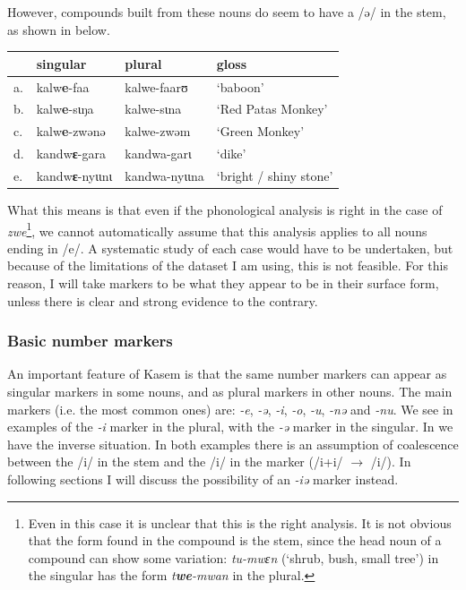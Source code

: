 However, compounds built from these nouns do seem to have a /ə/ in the stem, as shown in  below.

\begin{exe}
    \ex \label{stem-E-compounds}
    \begin{tabular}[t]{llll}
      & singular      & plural        & gloss                                          \\
      \midrule
      a. & kalw\textbf{e}-faa     & kalwe-faarʊ   & `baboon'                                       \\
      b. & kalw\textbf{e}-sɩŋa    & kalwe-sɩna    & `Red Patas Monkey'                             \\
      c. & kalw\textbf{e}-zwənə   & kalwe-zwəm    & `Green Monkey'                                 \\
      d. & kandw\textbf{ɛ}-gara   & kandwa-garɩ   & `dike' \\
      e. & kandw\textbf{ɛ}-nyɩɩnɩ & kandwa-nyɩɩna & `bright / shiny stone'                         \\
    \end{tabular}
\end{exe}

What this means is that even if the phonological analysis is right in the case of \textit{zwe}\footnote{Even in this case it is unclear that this is the right analysis. It is not obvious that the form found in the compound is the stem, since the head noun of a compound can show some variation: \textit{tu-mwɛn} (`shrub, bush, small tree') in the singular has the form \textit{t\textbf{we}-mwan} in the plural.}, we cannot automatically assume that this analysis applies to all nouns ending in /e/. A systematic study of each case would have to be undertaken, but because of the limitations of the dataset I am using, this is not feasible. For this reason, I will take markers to be what they appear to be in their surface form, unless there is clear and strong evidence to the contrary.

\subsubsection{Basic number markers}

An important feature of Kasem is that the same number markers can appear as singular markers in some nouns, and as plural markers in other nouns. The main markers (i.e. the most common ones) are: \textit{-e}, \textit{-ə}, \textit{-i}, \textit{-o}, \textit{-u},  \textit{-nə} and \textit{-nu}. We see in  examples of the \textit{-i} marker in the plural, with the \textit{-ə} marker in the singular. In  we have the inverse situation. In both examples there is an assumption of coalescence between the /i/ in the stem and the /i/ in the marker (/i+i/ $\rightarrow$ /i/). In following sections I will discuss the possibility of an \textit{-iə} marker instead.

